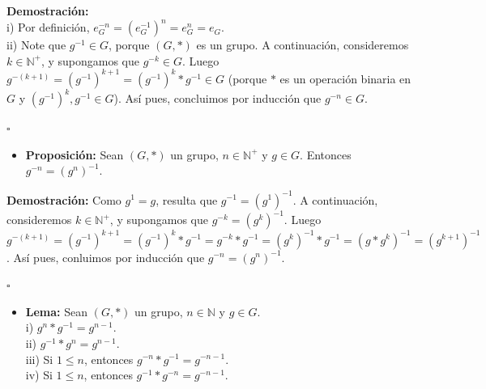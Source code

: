 \documentclass[10 pt]{article}
\begin{document}
\Large{\textbf{Demostración:} \\

i) Por definición, $e_G^{-n}=(e_G^{-1})^n=e_G^n=e_G$. \\

ii) Note que $g^{-1} \in G$, porque $(G,*)$ es un grupo. A continuación, consideremos $k \in \mathbb N^+$, y supongamos que $g^{-k} \in G$. Luego $g^{-(k+1)}=(g^{-1})^{k+1}=(g^{-1})^k*g^{-1} \in G$ (porque $*$ es un operación binaria en $G$ y $(g^{-1})^k,g^{-1} \in G$). Así pues, concluimos por inducción que $g^{-n} \in G$.} \\

\begin{flushright}
    $\square$
\end{flushright}

\begin{itemize}
    \item \Large{\textbf{Proposición:} Sean $(G,*)$ un grupo, $n \in \mathbb N^+$ y $g \in G$. Entonces $g^{-n}=(g^{n})^{-1}$.} \\
\end{itemize}

\Large{\textbf{Demostración:} Como $g^1=g$, resulta que $g^{-1}=(g^1)^{-1}$. A continuación, consideremos $k \in \mathbb N^+$, y supongamos que $g^{-k}=(g^k)^{-1}$. Luego $g^{-(k+1)}=(g^{-1})^{k+1}=(g^{-1})^k*g^{-1}=g^{-k}*g^{-1}=(g^{k})^{-1}*g^{-1}=(g*g^k)^{-1}=(g^{k+1})^{-1}$. Así pues, conluimos por inducción que $g^{-n}=(g^n)^{-1}$.} \\

\begin{flushright}
    $\square$
\end{flushright}

\begin{itemize}
    \item \Large{\textbf{Lema:} Sean $(G,*)$ un grupo, $n \in \mathbb N$ y $g \in G$. \\ 

    i) $g^n*g^{-1}=g^{n-1}$. \\

    ii) $g^{-1}*g^n=g^{n-1}$. \\

    iii) Si $1 \leq n$, entonces $g^{-n}*g^{-1}=g^{-n-1}$. \\

    iv) Si $1 \leq n$, entonces $g^{-1}*g^{-n}=g^{-n-1}$.} \\
\end{itemize}
\end{document}
